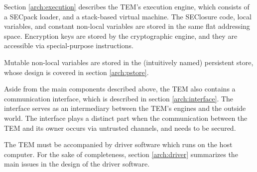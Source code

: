 Section \ref{arch:execution} describes the TEM's execution engine, which
consists of a SECpack loader, and a stack-based virtual machine. The SEClosure code, local variables, and constant non-local variables are stored in the same flat addressing space. Encryption keys are stored by the cryptographic engine, and they are accessible via special-purpose instructions.

Mutable non-local variables are stored in the (intuitively named) persistent
store, whose design is covered in section \ref{arch:pstore}.

Aside from the main components described above, the TEM also contains a
communication interface, which is described in section \ref{arch:interface}.
The interface serves as an intermediary between the TEM's engines and the
outside world. The interface plays a distinct part when the communication
between the TEM and its owner occurs via untrusted channels, and needs to be secured.

The TEM must be accompanied by driver software which runs on the host computer.
For the sake of completeness, section \ref{arch:driver} summarizes the main
issues in the design of the driver software.
